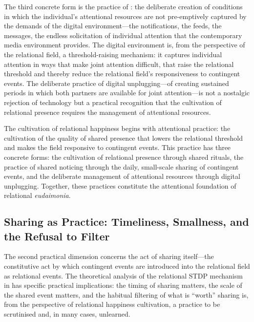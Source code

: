The third concrete form is the practice of : the deliberate creation of conditions in which the individual's attentional resources are not pre-emptively captured by the demands of the digital environment---the notifications, the feeds, the messages, the endless solicitation of individual attention that the contemporary media environment provides. The digital environment is, from the perspective of the relational field, a threshold-raising mechanism: it captures individual attention in ways that make joint attention difficult, that raise the relational threshold and thereby reduce the relational field's responsiveness to contingent events. The deliberate practice of digital unplugging---of creating sustained periods in which both partners are available for joint attention---is not a nostalgic rejection of technology but a practical recognition that the cultivation of relational presence requires the management of attentional resources.

\begin{claim}
The cultivation of relational happiness begins with attentional practice: the cultivation of the quality of shared presence that lowers the relational threshold and makes the field responsive to contingent events. This practice has three concrete forms: the cultivation of relational presence through shared rituals, the practice of shared noticing through the daily, small-scale sharing of contingent events, and the deliberate management of attentional resources through digital unplugging. Together, these practices constitute the attentional foundation of relational \emph{eudaimonia}.
\end{claim}

\subsection{Sharing as Practice: Timeliness, Smallness, and the Refusal to Filter}
\label{p14:subsec:sharingpractice}

\noindent
The second practical dimension concerns the act of sharing itself---the constitutive act by which contingent events are introduced into the relational field as relational events. The theoretical analysis of the relational STDP mechanism in  has specific practical implications: the timing of sharing matters, the scale of the shared event matters, and the habitual filtering of what is ``worth'' sharing is, from the perspective of relational happiness cultivation, a practice to be scrutinised and, in many cases, unlearned.


